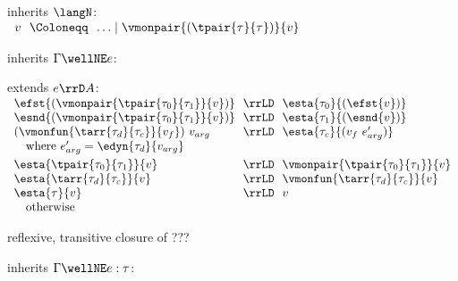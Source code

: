 \begin{flushleft}

\begin{minipage}[t]{\columnwidth}
 inherits $\langN$:\\
$\begin{array}{l@{~~}c@{~~}l}
  v & \Coloneqq & \ldots \mid \vmonpair{(\tpair{\tau}{\tau})}{v}
\end{array}$

\medskip
{} inherits $\Gamma \wellNE e$:
\begin{mathpar}
\end{mathpar}

\medskip
{} extends $e \rrD A$:\\
$\begin{array}{l@{~~}c@{~~}l}
  \efst{(\vmonpair{\tpair{\tau_0}{\tau_1}}{v})} & \rrLD & \esta{\tau_0}{(\efst{v})}
\\
  \esnd{(\vmonpair{\tpair{\tau_0}{\tau_1}}{v})} & \rrLD & \esta{\tau_1}{(\esnd{v})}
\\
  (\vmonfun{\tarr{\tau_d}{\tau_c}}{v_f})~v_{arg} & \rrLD & \esta{\tau_c}{(v_f~e_{arg}')}
\\ \multicolumn{3}{l}{\mbox{\quad where $e_{arg}' = \edyn{\tau_d}{v_{arg}}$}}
\\[0.8ex]
  \esta{\tpair{\tau_0}{\tau_1}}{v} & \rrLD & \vmonpair{\tpair{\tau_0}{\tau_1}}{v}
\\
  \esta{\tarr{\tau_d}{\tau_c}}{v} & \rrLD & \vmonfun{\tarr{\tau_d}{\tau_c}}{v}
\\
  \esta{\tau}{v} & \rrLD & v
\\ \multicolumn{3}{l}{\mbox{\quad otherwise}}
\end{array}$

\medskip
{} reflexive, transitive closure of ??? %
\smallskip
\end{minipage}%
\begin{minipage}[t]{\columnwidth}
 inherits $\Gamma \wellNE e : \tau$:
\begin{mathpar}
\end{mathpar}


\end{minipage}
\end{flushleft}
